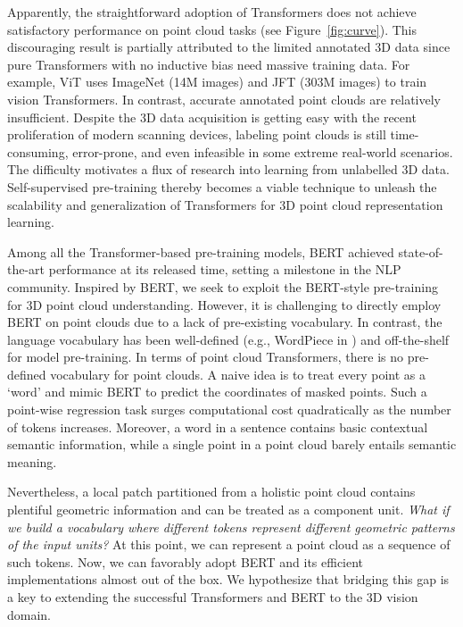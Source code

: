 \documentclass[10pt,twocolumn,letterpaper]{article}
\begin{document}
Apparently, the straightforward adoption of Transformers does not achieve satisfactory performance on point cloud tasks (see Figure~\ref{fig:curve}). This discouraging result is partially attributed to the limited annotated 3D data since pure Transformers with no inductive bias need massive training data. For example, ViT\cite{vit} uses ImageNet\cite{CNN} (14M images) and JFT\cite{jft} (303M images) to train vision Transformers. In contrast, accurate annotated point clouds are relatively insufficient. Despite the 3D data acquisition is getting easy with the recent proliferation of modern scanning devices, labeling point clouds is still time-consuming, error-prone, and even infeasible in some extreme real-world scenarios. The difficulty motivates a flux of research into learning from unlabelled 3D data.  Self-supervised pre-training thereby becomes a viable technique to unleash the scalability and generalization of Transformers for 3D point cloud representation learning.

Among all the Transformer-based pre-training models, BERT\cite{bert} achieved state-of-the-art performance at its released time, setting a milestone in the NLP community. Inspired by BERT\cite{bert}, we seek to exploit the BERT-style pre-training for 3D point cloud understanding.  However, it is challenging to directly employ BERT on point clouds due to a lack of pre-existing vocabulary. In contrast, the language vocabulary has been well-defined (e.g., WordPiece in \cite{bert}) and off-the-shelf for model pre-training. In terms of point cloud Transformers, there is no pre-defined vocabulary for point clouds.  A naive idea is to treat every point as a `word' and mimic BERT\cite{bert} to predict the coordinates of masked points.  Such a point-wise regression task surges computational cost quadratically as the number of tokens increases. Moreover, a word in a sentence contains basic contextual semantic information, while a single point in a point cloud barely entails semantic meaning. 
	
Nevertheless, a local patch partitioned from a holistic point cloud contains plentiful geometric information and can be treated as a component unit.   
\textit{What if we build a vocabulary where different tokens represent different geometric patterns of the input units?} 
At this point, we can represent a point cloud as a sequence of such tokens. Now, we can favorably adopt BERT and its efficient implementations almost out of the box. We hypothesize that bridging this gap is a key to extending the successful Transformers and BERT to the 3D vision domain. 
\end{document}
